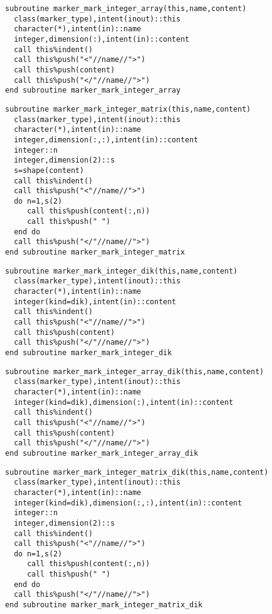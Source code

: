 \begin{Verbatim}
  subroutine marker_mark_integer_array(this,name,content)
    class(marker_type),intent(inout)::this
    character(*),intent(in)::name
    integer,dimension(:),intent(in)::content
    call this%indent()
    call this%push("<"//name//">")
    call this%push(content)
    call this%push("</"//name//">")
  end subroutine marker_mark_integer_array
\end{Verbatim}

\begin{Verbatim}
  subroutine marker_mark_integer_matrix(this,name,content)
    class(marker_type),intent(inout)::this
    character(*),intent(in)::name
    integer,dimension(:,:),intent(in)::content
    integer::n
    integer,dimension(2)::s
    s=shape(content)
    call this%indent()
    call this%push("<"//name//">")
    do n=1,s(2)
       call this%push(content(:,n))
       call this%push(" ")
    end do
    call this%push("</"//name//">")
  end subroutine marker_mark_integer_matrix
\end{Verbatim}

\begin{Verbatim}
  subroutine marker_mark_integer_dik(this,name,content)
    class(marker_type),intent(inout)::this
    character(*),intent(in)::name
    integer(kind=dik),intent(in)::content
    call this%indent()
    call this%push("<"//name//">")
    call this%push(content)
    call this%push("</"//name//">")
  end subroutine marker_mark_integer_dik
\end{Verbatim}

\begin{Verbatim}
  subroutine marker_mark_integer_array_dik(this,name,content)
    class(marker_type),intent(inout)::this
    character(*),intent(in)::name
    integer(kind=dik),dimension(:),intent(in)::content
    call this%indent()
    call this%push("<"//name//">")
    call this%push(content)
    call this%push("</"//name//">")
  end subroutine marker_mark_integer_array_dik
\end{Verbatim}

\begin{Verbatim}
  subroutine marker_mark_integer_matrix_dik(this,name,content)
    class(marker_type),intent(inout)::this
    character(*),intent(in)::name
    integer(kind=dik),dimension(:,:),intent(in)::content
    integer::n
    integer,dimension(2)::s
    call this%indent()
    call this%push("<"//name//">")
    do n=1,s(2)
       call this%push(content(:,n))
       call this%push(" ")
    end do
    call this%push("</"//name//">")
  end subroutine marker_mark_integer_matrix_dik
\end{Verbatim}

